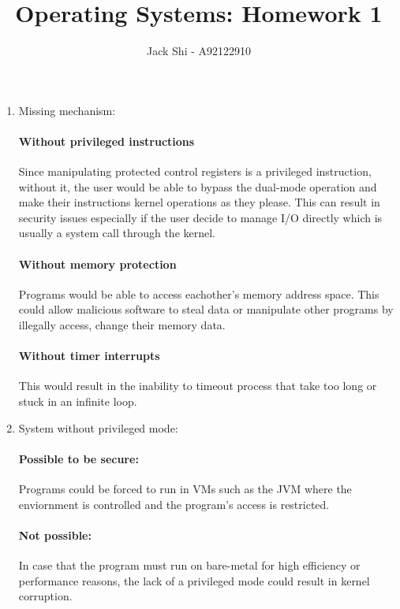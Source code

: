 \documentclass{article}
\title{Operating Systems: Homework 1}
\author{Jack Shi - A92122910}
\begin{document}
\maketitle

\begin{enumerate} [label=\textbf{\arabic*}.]
	\item Missing mechanism:
		\paragraph{Without privileged instructions}Since manipulating protected
		control registers is a privileged instruction, without it, the user would be
		able to bypass the dual-mode operation and make their instructions kernel
		operations as they please. This can result in security issues especially if
		the user decide to manage I/O directly which is usually a system call
		through the kernel.
		\paragraph{Without memory protection}Programs would be able to access
		eachother's memory address space. This could allow malicious software to
		steal data or manipulate other programs by illegally access, change their
		memory data.
		\paragraph{Without timer interrupts}This would result in the inability to
		timeout process that take too long or stuck in an infinite loop.

	\item System without privileged mode:
		\paragraph{Possible to be secure:}Programs could be forced to run in VMs
		such as the JVM where the enviornment is controlled and the program's access
		is restricted.
		\paragraph{Not possible:}In case that the program must run on bare-metal for
		high efficiency or performance reasons, the lack of a privileged mode could
		result in kernel corruption.


\end{enumerate}
\end{document}
